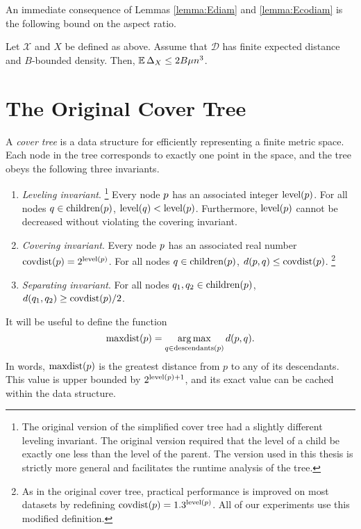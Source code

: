 \documentclass[../main.tex]{subfiles}
\newcommand{\set}[1]{\mathcal {#1}}
\newcommand{\distribution}[1]{\mathcal {#1}}
\newcommand{\dist}[2]{\distf({#1},{#2})}
\newcommand{\distf}{d}
\newcommand{\aspect}[1]{\Delta_{#1}}
\newcommand{\p}{\ensuremath p}
\newcommand{\q}{\ensuremath q}
\newcommand{\mkfunction}[1]{\ifmmode{\textnormal{{#1}}}}
\newcommand{\level}[1]      {\mkfunction{level}({#1})}
\newcommand{\children}[1]   {\mkfunction{children}({#1})}
\newcommand{\covdist}[1]    {\mkfunction{covdist}({#1})}
\newcommand{\descendants}[1]{\mkfunction{descendants}({#1})}
\newcommand{\maxdist}[1]    {\mkfunction{maxdist}({#1})}
\begin{document}

An immediate consequence of Lemmas \ref{lemma:Ediam} and \ref{lemma:Ecodiam} is the following bound on the aspect ratio.

\begin{lemma}
    \label{lemma:Easpect}
    Let $\set X$ and $X$ be defined as above.
    Assume that $\distribution D$ has finite expected distance and $B$-bounded density.
    Then, $\E\aspect{X} \le2B\mu n^3$. 
\end{lemma}


\section{The Original Cover Tree}

A \emph{cover tree} is a data structure for efficiently representing a finite metric space.
Each node in the tree corresponds to exactly one point in the space,
and the tree obeys the following three invariants.
\begin{enumerate}
    \item \emph{Leveling invariant}.%
    \footnote{
        The original version of the simplified cover tree \citep{izbicki2015faster} had a slightly different leveling invariant.
        The original version required that the level of a child be exactly one less than the level of the parent.
        The version used in this thesis is strictly more general and facilitates the runtime analysis of the tree.
    }
    Every node $\p$ has an associated integer $\level\p$.
    For all nodes $\q\in\children\p$, $\level\q < \level\p$.
    Furthermore, $\level p$ cannot be decreased without violating the covering invariant.
    \item \emph{Covering invariant}.
    Every node $\p$ has an associated real number $\covdist\p=2^{\level\p}$.
    For all nodes $\q\in\children\p$, $\dist \p \q \le \covdist\p$.%
    \footnote{
        As in the original cover tree, practical performance is improved on most datasets by redefining $\covdist p = 1.3 ^ {\level p}$.
        All of our experiments use this modified definition.
    }
    \item \emph{Separating invariant}.
    For all nodes $\q_1,\q_2\in\children\p$, $\dist {\q_1} {\q_2} \ge \covdist\p/2$.
\end{enumerate}
It will be useful to define the function
\begin{equation}
\maxdist p = \argmax_{q\in\descendants{p}} \dist p q
.
\end{equation}
In words, $\maxdist\p$ is the greatest distance from $p$ to any of its descendants.
This value is upper bounded by $2^{\level{p}+1}$, 
and its exact value can be cached within the data structure.
\end{document}
